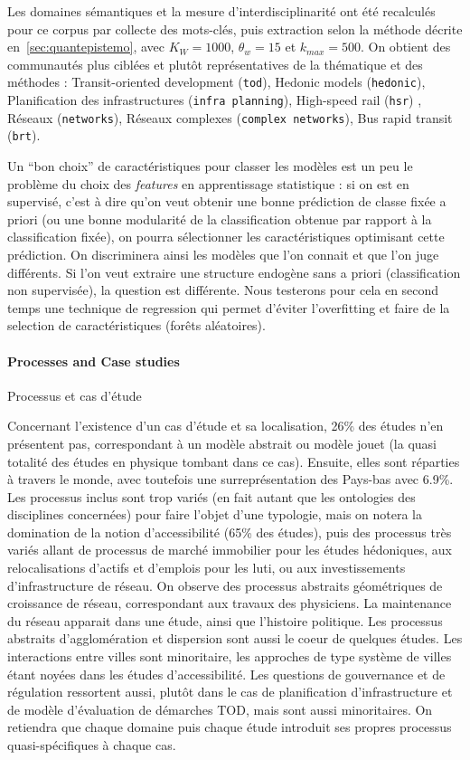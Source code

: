 Les domaines sémantiques et la mesure d'interdisciplinarité ont été recalculés pour ce corpus par collecte des mots-clés, puis extraction selon la méthode décrite en~\ref{sec:quantepistemo}, avec $K_W=1000$, $\theta_w=15$ et $k_{max}=500$. On obtient des communautés plus ciblées et plutôt représentatives de la thématique et des méthodes : Transit-oriented development (\texttt{tod}), Hedonic models (\texttt{hedonic}), Planification des infrastructures (\texttt{infra planning}), High-speed rail (\texttt{hsr}) , Réseaux (\texttt{networks}), Réseaux complexes (\texttt{complex networks}), Bus rapid transit (\texttt{brt}).


Un ``bon choix'' de caractéristiques pour classer les modèles est un peu le problème du choix des \emph{features} en apprentissage statistique : si on est en supervisé, c'est à dire qu'on veut obtenir une bonne prédiction de classe fixée a priori (ou une bonne modularité de la classification obtenue par rapport à la classification fixée), on pourra sélectionner les caractéristiques optimisant cette prédiction. On discriminera ainsi les modèles que l'on connait et que l'on juge différents. Si l'on veut extraire une structure endogène sans a priori (classification non supervisée), la question est différente. Nous testerons pour cela en second temps une technique de regression qui permet d'éviter l'overfitting et faire de la selection de caractéristiques (forêts aléatoires).



\paragraph{Processes and Case studies}{Processus et cas d'étude}

Concernant l'existence d'un cas d'étude et sa localisation, 26\% des études n'en présentent pas, correspondant à un modèle abstrait ou modèle jouet (la quasi totalité des études en physique tombant dans ce cas). Ensuite, elles sont réparties à travers le monde, avec toutefois une surreprésentation des Pays-bas avec 6.9\%. Les processus inclus sont trop variés (en fait autant que les ontologies des disciplines concernées) pour faire l'objet d'une typologie, mais on notera la domination de la notion d'accessibilité (65\% des études), puis des processus très variés allant de processus de marché immobilier pour les études hédoniques, aux relocalisations d'actifs et d'emplois pour les luti, ou aux investissements d'infrastructure de réseau. On observe des processus abstraits géométriques de croissance de réseau, correspondant aux travaux des physiciens. La maintenance du réseau apparait dans une étude, ainsi que l'histoire politique. Les processus abstraits d'agglomération et dispersion sont aussi le coeur de quelques études. Les interactions entre villes sont minoritaire, les approches de type système de villes étant noyées dans les études d'accessibilité. Les questions de gouvernance et de régulation ressortent aussi, plutôt dans le cas de planification d'infrastructure et de modèle d'évaluation de démarches TOD, mais sont aussi minoritaires. On retiendra que chaque domaine puis chaque étude introduit ses propres processus quasi-spécifiques à chaque cas.



